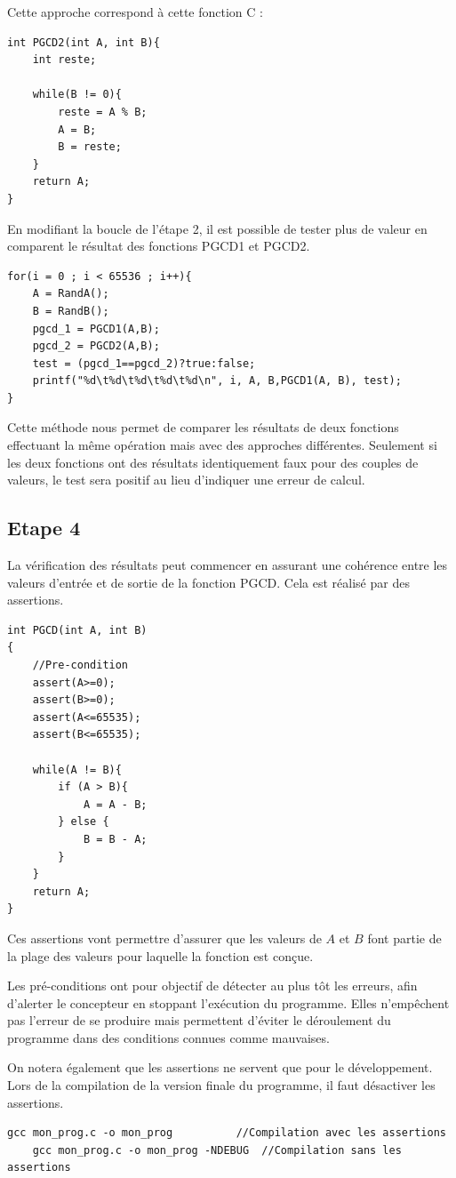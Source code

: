 \documentclass[a4paper]{article}
\begin{document}
        Cette approche correspond à cette fonction C :
\begin{lstlisting}[style=CStyle]
int PGCD2(int A, int B){
	int reste;

	while(B != 0){
		reste = A % B;
		A = B;
		B = reste;
	}
	return A;
}
\end{lstlisting}
        En modifiant la boucle de l'étape 2, il est possible de tester plus de valeur en comparent le résultat des fonctions PGCD1 et PGCD2.
\begin{lstlisting}[style=CStyle]
for(i = 0 ; i < 65536 ; i++){
	A = RandA();
	B = RandB();
	pgcd_1 = PGCD1(A,B);
	pgcd_2 = PGCD2(A,B);
	test = (pgcd_1==pgcd_2)?true:false;
	printf("%d\t%d\t%d\t%d\t%d\n", i, A, B,PGCD1(A, B), test);
}
\end{lstlisting}
        Cette méthode nous permet de comparer les résultats de deux fonctions effectuant la même opération mais avec des approches différentes. Seulement si les deux fonctions ont des résultats identiquement faux pour des couples de valeurs, le test sera positif au lieu d'indiquer une erreur de calcul.
    \newpage
    \subsection{Etape 4}
        La vérification des résultats peut commencer en assurant une cohérence entre les valeurs d'entrée et de sortie de la fonction PGCD. Cela est réalisé par des assertions.
 \begin{lstlisting}[style=CStyle]
int PGCD(int A, int B)
{
    //Pre-condition
	assert(A>=0);
	assert(B>=0);
	assert(A<=65535);
	assert(B<=65535);
	
	while(A != B){
		if (A > B){
			A = A - B;
		} else {
			B = B - A;
		}
	}
	return A;
}
\end{lstlisting}
         Ces assertions vont permettre d'assurer que les valeurs de $A$ et $B$ font partie de la plage des valeurs pour laquelle la fonction est conçue.
         
         Les pré-conditions ont pour objectif de détecter au plus tôt les erreurs, 
         afin d’alerter le concepteur en stoppant l’exécution du programme. 
         Elles n'empêchent pas l'erreur de se produire mais permettent d'éviter le déroulement 
         du programme dans des conditions connues comme mauvaises.

         On notera également que les assertions ne servent que pour le développement. Lors de la compilation de la version finale du programme, il faut désactiver les assertions.
\begin{lstlisting}[style=CStyle]
    gcc mon_prog.c -o mon_prog          //Compilation avec les assertions
    gcc mon_prog.c -o mon_prog -NDEBUG  //Compilation sans les assertions
\end{lstlisting}
\end{document}

